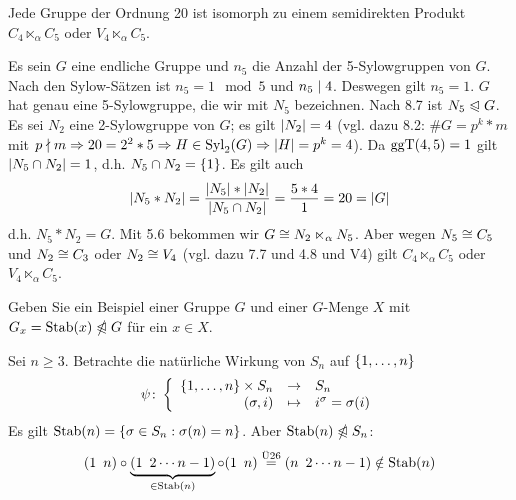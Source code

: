 \begin{exercisePage}
\begin{solution}
\begin{itemize}[leftmargin=*]
	\end{itemize}
\end{solution}
%
\begin{exercise}
	Jede Gruppe der Ordnung 20 ist isomorph zu einem semidirekten Produkt $C_4 \ltimes_{\alpha} C_5$ oder $V_4 \ltimes_{\alpha} C_5$.
\end{exercise}
\begin{solution}
	Es sein $G$ eine endliche Gruppe und $n_5$ die Anzahl der 5-Sylowgruppen von $G$. Nach den Sylow-Sätzen ist $n_5 = 1 \mod 5$ und $n_5 \mathrel{\mid} 4$. Deswegen gilt $n_5 = 1$. $G$ hat genau eine 5-Sylowgruppe, die wir mit $N_5$ bezeichnen. Nach 8.7 ist $N_5 \mathrel{\trianglelefteqslant} G$. Es sei $N_2$ eine 2-Sylowgruppe von $G$; es gilt $\left| N_2 \right| = 4$ (vgl. dazu 8.2: $\# G = p^k * m$ mit $p \mathrel{\nmid} m \Rightarrow 20 = 2^2*5 \Rightarrow H \in \operatorname{Syl}_2(G) \Rightarrow \left| H \right| = p^k = 4$). Da $\operatorname{ggT}(4,5)=1$ gilt $\left| N_5 \cap N_2 \right| = 1$, d.h. $N_5 \cap N_2 = \left\{ 1 \right\}$. Es gilt auch
	\begin{align*}
		\left| N_5 * N_2 \right| = \frac{\left| N_5 \right|*\left| N_2 \right|}{\left| N_5 \cap N_2 \right|} = \frac{5*4}{1} = 20 = \left| G \right|
	\end{align*}
	d.h. $N_5 * N_2 = G$. Mit 5.6 bekommen wir $G \mathrel{\cong} N_2 \ltimes_{\alpha} N_5$. Aber wegen $N_5 \mathrel{\cong} C_5$ und $N_2 \mathrel{\cong} C_3$ oder $N_2 \mathrel{\cong} V_4$ (vgl. dazu 7.7 und 4.8 und V4) gilt $C_4 \ltimes_{\alpha} C_5$ oder $V_4 \ltimes_{\alpha} C_5$.
\end{solution}
%
\pagebreak
%
\setcounter{taskcount}{62}
%
\begin{exercise}[Präsenz]
	Geben Sie ein Beispiel einer Gruppe $G$ und einer $G$-Menge $X$ mit $G_x = \operatorname{Stab}(x) \mathrel{\ntrianglelefteqslant} G$ für ein $x \in X$.
\end{exercise}
\begin{solution}
	Sei $n \geq 3$. Betrachte die natürliche Wirkung von $S_n$ auf $\left\{ 1, \dots , n \right\}$
	\begin{align*}
		\psi \colon \left\lbrace \begin{array}{rcl} \left\{ 1, \dots , n \right\} \times S_n & \to & S_n \\(\sigma, i) & \mapsto & i^{\sigma} = \sigma(i) \end{array} \right.
	\end{align*}
	Es gilt $\operatorname{Stab}(n) = \left\{ \sigma \in S_n : \sigma(n) = n \right\}$. Aber $\operatorname{Stab}(n) \mathrel{\ntrianglelefteqslant} S_n$:
	\begin{align*}
		(1 \enspace n) \circ \underbrace{(1 \enspace 2 \cdots n-1)}_{\in \operatorname{Stab}(n)} \circ (1 \enspace n) \overset{\text{Ü26}}{=} (n \enspace 2 \cdots n-1) \notin \operatorname{Stab}(n)
	\end{align*}
\end{solution}
%
\begin{exercise}[Präsenz]

\end{exercise}
\end{exercisePage}

